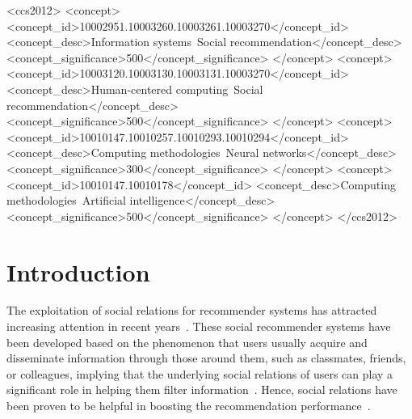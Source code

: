 \documentclass[sigconf]{acmart} \copyrightyear{2019}
\begin{document}
\begin{CCSXML}
<ccs2012>
<concept>
<concept_id>10002951.10003260.10003261.10003270</concept_id>
<concept_desc>Information systems~Social recommendation</concept_desc>
<concept_significance>500</concept_significance>
</concept>
<concept>
<concept_id>10003120.10003130.10003131.10003270</concept_id>
<concept_desc>Human-centered computing~Social recommendation</concept_desc>
<concept_significance>500</concept_significance>
</concept>
<concept>
<concept_id>10010147.10010257.10010293.10010294</concept_id>
<concept_desc>Computing methodologies~Neural networks</concept_desc>
<concept_significance>300</concept_significance>
</concept>
<concept>
<concept_id>10010147.10010178</concept_id>
<concept_desc>Computing methodologies~Artificial intelligence</concept_desc>
<concept_significance>500</concept_significance>
</concept>
</ccs2012>
\end{CCSXML}




\maketitle






\section{Introduction}

The exploitation of social relations for recommender systems has attracted increasing attention in recent years~\cite{ma2011recommender, tang2013exploiting, tang2016recommendation}. These social recommender systems have been developed based on the phenomenon that users usually acquire and disseminate information through those around them, such as classmates, friends, or colleagues, implying that the underlying social relations of users can play a significant role in helping them filter information~\cite{resnick1997recommender}. Hence, social relations have been proven to be helpful in boosting the recommendation performance~\cite{DeepSoR2018,tang2013social}.
\end{document}
